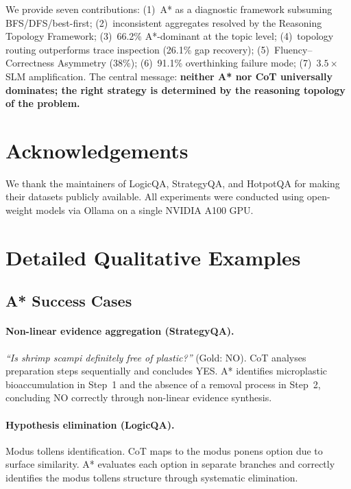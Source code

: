 \documentclass[11pt]{article}
\begin{document}
We provide seven contributions: (1)~A* as a diagnostic framework subsuming
BFS/DFS/best-first; (2)~inconsistent aggregates resolved by the Reasoning
Topology Framework; (3)~66.2\% A*-dominant at the topic level; (4)~topology
routing outperforms trace inspection (26.1\% gap recovery);
(5)~Fluency--Correctness Asymmetry (38\%); (6)~91.1\% overthinking failure
mode; (7)~$3.5\times$ SLM amplification.  The central message:
\textbf{neither A* nor CoT universally dominates; the right strategy is
determined by the reasoning topology of the problem.}

\section*{Acknowledgements}
We thank the maintainers of LogicQA, StrategyQA, and HotpotQA for
making their datasets publicly available.  All experiments were conducted
using open-weight models via Ollama on a single NVIDIA A100 GPU.



\appendix

\section{Detailed Qualitative Examples}
\label{app:qualitative}

\subsection{A* Success Cases}

\paragraph{Non-linear evidence aggregation (StrategyQA).}
\emph{``Is shrimp scampi definitely free of plastic?''} (Gold: NO).
CoT analyses preparation steps sequentially and concludes YES.  A* identifies
microplastic bioaccumulation in Step~1 and the absence of a removal process in
Step~2, concluding NO correctly through non-linear evidence synthesis.

\paragraph{Hypothesis elimination (LogicQA).}
Modus tollens identification.  CoT maps to the modus ponens option due to
surface similarity.  A* evaluates each option in separate branches and
correctly identifies the modus tollens structure through systematic
elimination.
\end{document}
